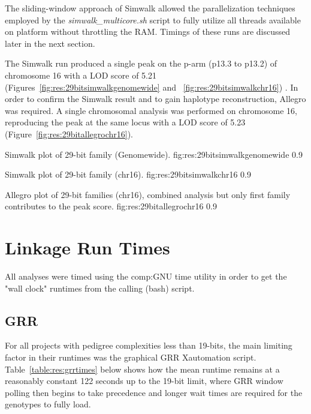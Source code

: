 The sliding-window approach of Simwalk allowed the parallelization techniques employed by the \textit{simwalk\_multicore.sh} script to fully utilize all threads available on platform without throttling the RAM. Timings of these runs are discussed later in the next section.

The Simwalk run produced a single peak on the p-arm (p13.3 to p13.2) of chromosome 16 with a LOD score of 5.21 (Figures~\ref{fig:res:29bitsimwalkgenomewide} and ~\ref{fig:res:29bitsimwalkchr16}) . In order to confirm the Simwalk result and to gain haplotype reconstruction, Allegro was required. A single chromosomal analysis was performed on chromosome 16, reproducing the peak at the same locus  with a LOD score of 5.23 (Figure~\ref{fig:res:29bitallegrochr16}).

	{Simwalk plot of 29-bit family (Genomewide).}
	{fig:res:29bitsimwalkgenomewide}
	{0.9}{}

	{Simwalk plot of 29-bit family (chr16).}
	{fig:res:29bitsimwalkchr16}
	{0.9}{}
	
	{Allegro plot of 29-bit families (chr16), combined analysis but only first family contributes to the peak score.}
	{fig:res:29bitallegrochr16}
	{0.9}{}


\section{Linkage Run Times}

All analyses were timed using the \gls{comp:GNU} time utility in order to get the "wall clock" runtimes from the calling (bash) script.

\subsection{GRR}
For all projects with pedigree complexities less than 19-bits, the main limiting factor in their runtimes was the graphical GRR Xautomation script. Table~\ref{table:res:grrtimes} below shows how the mean runtime  remains at a reasonably constant 122 seconds up to the 19-bit limit, where GRR window polling then begins to take precedence and longer wait times are required for the genotypes to fully load.


